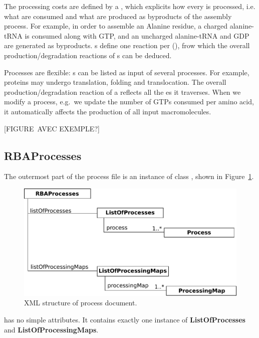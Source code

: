 The processing costs are defined by a \processingmap{},
which explicits how every \component{} is processed, i.e.
what \species{} are consumed and what \species{} are
produced as byproducts of the assembly process.
For example, in order to assemble an Alanine residue,
a charged alanine-tRNA is consumed along with GTP,
and an uncharged alanine-tRNA and GDP are generated as byproducts.
\processingmap{}s define one reaction per \component(), frow which
the overall production/degradation reactions of \macromolecule{}s can be deduced.

Processes are flexible:
\macromolecule{}s can be listed as input of several processes.
For example, proteins may undergo translation, folding and translocation.
The overall production/degradation reaction of a \macromolecule{} reflects
all the \process{}es it traverses.
When we modify a process,
e.g.\ we update the number of GTPs consumed per amino acid,
it automatically affects the production of all input macromolecules.


[FIGURE AVEC EXEMPLE?]

\subsection{RBAProcesses}
\label{sec:rba_processes}

The outermost part of the process file is an instance of class
\rbaprocesses, shown in Figure~\ref{fig:processes_doc}.

\begin{figure}
  \centering
  \includegraphics[scale=0.8]{figures/processes_doc}
  \caption{XML structure of process document.}
\label{fig:processes_doc}
\end{figure}

\rbaprocesses{} has no simple attributes.
It contains exactly one instance of \textbf{ListOfProcesses}
and \textbf{ListOfProcessingMaps}.


